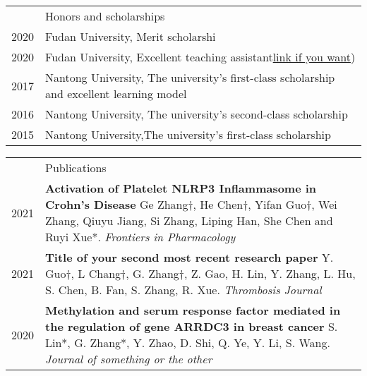 \documentclass[letterpaper, 11pt]{article}
\newcommand{\headingfont}{\Large\color{OliveGreen}}
\newenvironment{SectionTable}[1]{
	\renewcommand*{\arraystretch}{1.7}
	\setlength{\tabcolsep}{10pt}
	\begin{longtable}{Rp{5.2in}} & #1 \\}
{\end{longtable}\vspace{-.3cm}}
\newenvironment{SectionTableSingleSpace}[1]{
	\renewcommand*{\arraystretch}{1.2}
	\setlength{\tabcolsep}{10pt}
	\begin{longtable}{Rp{5.2in}} & #1 \\[0.6em]}
{\end{longtable}\vspace{-.3cm}}
\begin{document}
\begin{SectionTableSingleSpace}{\headingfont Honors and scholarships}
2020 & 
Fudan University, Merit scholarshi \\

2020 &
Fudan University, Excellent teaching assistant\href{https://en.wikibooks.org/wiki/LaTeX/Hyperlinks}{link if you want}) \\

2017 &
Nantong University, The university's first-class scholarship and excellent learning model \\

2016 &
Nantong University, The university's second-class scholarship  \\

2015 &
Nantong University,The university's first-class scholarship 
\end{SectionTableSingleSpace}


\begin{SectionTable}{\headingfont Publications} 
2021 & 
\textbf{Activation of Platelet NLRP3 Inflammasome in Crohn’s Disease} \newline
Ge Zhang†, He Chen†, Yifan Guo†, Wei Zhang, Qiuyu Jiang, Si Zhang, Liping Han, She Chen and Ruyi Xue*. \newline
\textit{Frontiers in Pharmacology} \\

2021 & 
\textbf{Title of your second most recent research paper} \newline
Y. Guo†, L Chang†, G. Zhang†, Z. Gao, H. Lin, Y. Zhang, L. Hu, S. Chen, B. Fan, S. Zhang, R. Xue. \newline
\textit{Thrombosis Journal} \\

2020 & 
\textbf{Methylation and serum response factor mediated in the regulation of gene ARRDC3 in breast cancer} \newline
S. Lin*, G. Zhang*, Y. Zhao, D. Shi, Q. Ye, Y. Li, S. Wang. \newline
\textit{Journal of something or the other}

\end{SectionTable}

\end{document}
